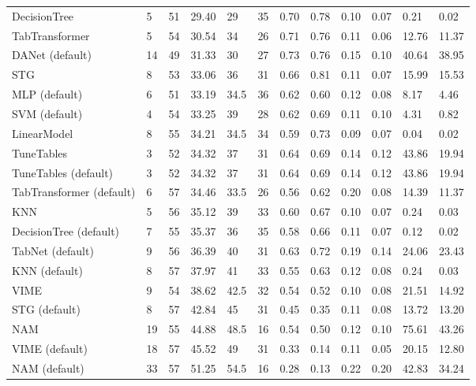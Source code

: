 \begin{tabular}{lllllrllllll}
DecisionTree & 5 & 51 & 29.40 & 29 & 35 & 0.70 & 0.78 & 0.10 & 0.07 & 0.21 & 0.02 \\
TabTransformer & 5 & 54 & 30.54 & 34 & 26 & 0.71 & 0.76 & 0.11 & 0.06 & 12.76 & 11.37 \\
DANet (default) & 14 & 49 & 31.33 & 30 & 27 & 0.73 & 0.76 & 0.15 & 0.10 & 40.64 & 38.95 \\
STG & 8 & 53 & 33.06 & 36 & 31 & 0.66 & 0.81 & 0.11 & 0.07 & 15.99 & 15.53 \\
MLP (default) & 6 & 51 & 33.19 & 34.5 & 36 & 0.62 & 0.60 & 0.12 & 0.08 & 8.17 & 4.46 \\
SVM (default) & 4 & 54 & 33.25 & 39 & 28 & 0.62 & 0.69 & 0.11 & 0.10 & 4.31 & 0.82 \\
LinearModel & 8 & 55 & 34.21 & 34.5 & 34 & 0.59 & 0.73 & 0.09 & 0.07 & 0.04 & 0.02 \\
TuneTables & 3 & 52 & 34.32 & 37 & 31 & 0.64 & 0.69 & 0.14 & 0.12 & 43.86 & 19.94 \\
TuneTables (default) & 3 & 52 & 34.32 & 37 & 31 & 0.64 & 0.69 & 0.14 & 0.12 & 43.86 & 19.94 \\
TabTransformer (default) & 6 & 57 & 34.46 & 33.5 & 26 & 0.56 & 0.62 & 0.20 & 0.08 & 14.39 & 11.37 \\
KNN & 5 & 56 & 35.12 & 39 & 33 & 0.60 & 0.67 & 0.10 & 0.07 & 0.24 & 0.03 \\
DecisionTree (default) & 7 & 55 & 35.37 & 36 & 35 & 0.58 & 0.66 & 0.11 & 0.07 & 0.12 & 0.02 \\
TabNet (default) & 9 & 56 & 36.39 & 40 & 31 & 0.63 & 0.72 & 0.19 & 0.14 & 24.06 & 23.43 \\
KNN (default) & 8 & 57 & 37.97 & 41 & 33 & 0.55 & 0.63 & 0.12 & 0.08 & 0.24 & 0.03 \\
VIME & 9 & 54 & 38.62 & 42.5 & 32 & 0.54 & 0.52 & 0.10 & 0.08 & 21.51 & 14.92 \\
STG (default) & 8 & 57 & 42.84 & 45 & 31 & 0.45 & 0.35 & 0.11 & 0.08 & 13.72 & 13.20 \\
NAM & 19 & 55 & 44.88 & 48.5 & 16 & 0.54 & 0.50 & 0.12 & 0.10 & 75.61 & 43.26 \\
VIME (default) & 18 & 57 & 45.52 & 49 & 31 & 0.33 & 0.14 & 0.11 & 0.05 & 20.15 & 12.80 \\
NAM (default) & 33 & 57 & 51.25 & 54.5 & 16 & 0.28 & 0.13 & 0.22 & 0.20 & 42.83 & 34.24 \\
\bottomrule
\end{tabular}
